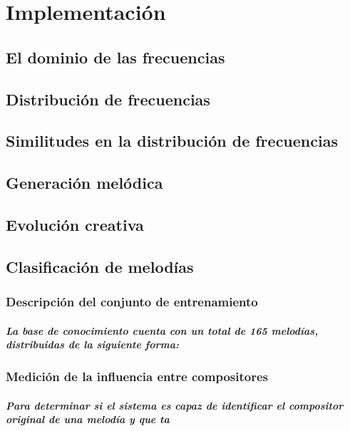 \chapter {Implementación}
    \section {El dominio de las frecuencias}
    \section {Distribución de frecuencias}
    \section {Similitudes en la distribución de frecuencias}
    \section {Generación melódica}
    \section {Evolución creativa}
    


\section{Clasificación de melodías}


\subsection{Descripción del conjunto de entrenamiento}
\paragraph{La base de conocimiento cuenta con un total de 165 melodías, distribuidas de la siguiente forma:}


%

\subsection{Medición de la influencia entre compositores}
\paragraph{Para determinar si el sistema es capaz de identificar el compositor original de una melodía y que ta}

